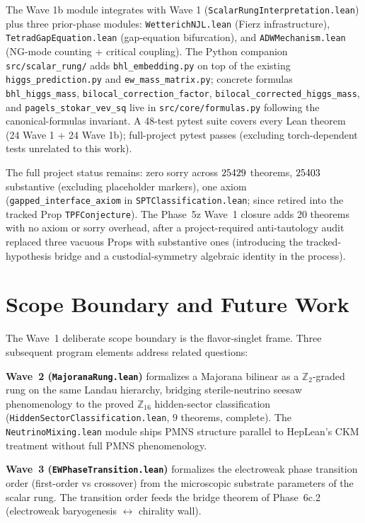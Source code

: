 \documentclass[aps,prd,twocolumn,showpacs,superscriptaddress,nofootinbib]{revtex4-2}
\begin{document}
The Wave 1b module integrates with Wave 1 (\texttt{ScalarRungInterpretation.lean})
plus three prior-phase modules: \texttt{WetterichNJL.lean} (Fierz
infrastructure), \texttt{TetradGapEquation.lean} (gap-equation
bifurcation), and \texttt{ADWMechanism.lean} (NG-mode counting + critical
coupling). The Python companion \texttt{src/scalar\_rung/} adds
\texttt{bhl\_embedding.py} on top of the existing
\texttt{higgs\_prediction.py} and \texttt{ew\_mass\_matrix.py}; concrete
formulas \texttt{bhl\_higgs\_mass}, \texttt{bilocal\_correction\_factor},
\texttt{bilocal\_corrected\_higgs\_mass}, and
\texttt{pagels\_stokar\_vev\_sq} live in \texttt{src/core/formulas.py}
following the canonical-formulas invariant. A 48-test pytest suite
covers every Lean theorem (24 Wave 1 + 24 Wave 1b);
full-project pytest passes (excluding torch-dependent tests unrelated to
this work).

The full project status remains: zero sorry across $25429{}$
theorems, $25403{}$ substantive (excluding placeholder
markers), one axiom (\texttt{gapped\_interface\_axiom} in
\texttt{SPTClassification.lean}; since retired into the tracked Prop
\texttt{TPFConjecture}). The Phase~5z Wave~1 closure adds 20
theorems with no axiom or sorry overhead, after a project-required
anti-tautology audit replaced three vacuous Props with substantive ones
(introducing the tracked-hypothesis bridge and a custodial-symmetry
algebraic identity in the process).

\section{Scope Boundary and Future Work}
\label{sec:scope}

The Wave~1 deliberate scope boundary is the flavor-singlet frame.
Three subsequent program elements address related questions:

\textbf{Wave~2 (\texttt{MajoranaRung.lean})} formalizes a Majorana
bilinear as a $\mathbb{Z}_2$-graded rung on the same Landau hierarchy,
bridging sterile-neutrino seesaw phenomenology to the proved $\mathbb{Z}_{16}$
hidden-sector classification (\texttt{HiddenSectorClassification.lean},
$9$ theorems, complete). The
\texttt{NeutrinoMixing.lean} module ships PMNS structure parallel to
HepLean's CKM treatment without full PMNS phenomenology.

\textbf{Wave~3 (\texttt{EWPhaseTransition.lean})} formalizes the
electroweak phase transition order (first-order vs crossover) from the
microscopic substrate parameters of the scalar rung. The transition
order feeds the bridge theorem of Phase~6c.2 (electroweak baryogenesis
$\leftrightarrow$ chirality wall).
\end{document}

